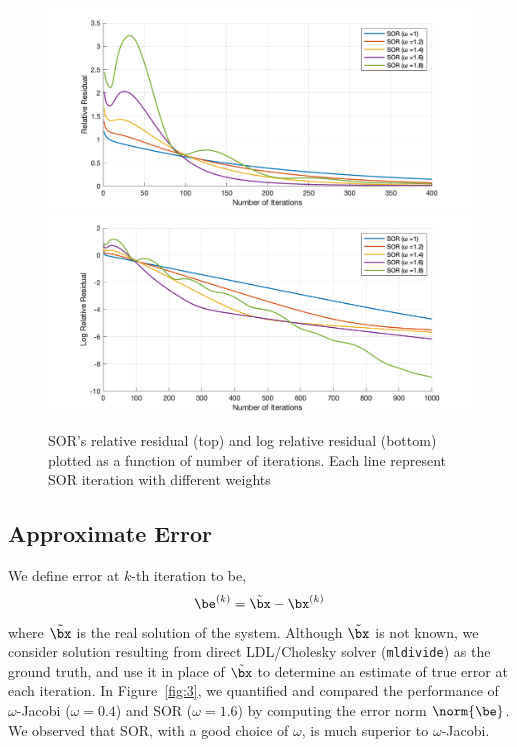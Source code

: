 \documentclass[11pt,titlepage]{article}
\begin{document}
\begin{figure}[!htbp]
    \begin{center}
        \includegraphics[width=\textwidth]{archbridge_tiny_sor_relres_vs_iters}
        \includegraphics[width=\textwidth]{archbridge_tiny_sor_logrelres_vs_iters}
        \caption{\label{fig:2} SOR's relative residual (top) and log relative residual (bottom) plotted as a function of number of iterations. Each line represent SOR iteration with different weights}
    \end{center}
\end{figure}


\subsection{Approximate Error}

We define error at $k$-th iteration to be, 
\[
    \be^{(k)} = \tilde{\bx} - \bx^{(k)}
\]
where $\tilde{\bx}$ is the real solution of the system. Although $\tilde{\bx}$ is not known, we consider solution resulting from direct LDL/Cholesky solver (\texttt{mldivide}) as the ground truth, and use it in place of $\tilde{\bx}$ to determine an estimate of true error at each iteration. In Figure~\ref{fig:3}, we quantified and compared the performance of $\omega$-Jacobi ($\omega=0.4$) and SOR ($\omega=1.6$) by computing the error norm $\norm{\be}$. We observed that SOR, with a good choice of $\omega$, is much superior to $\omega$-Jacobi.
\end{document}
